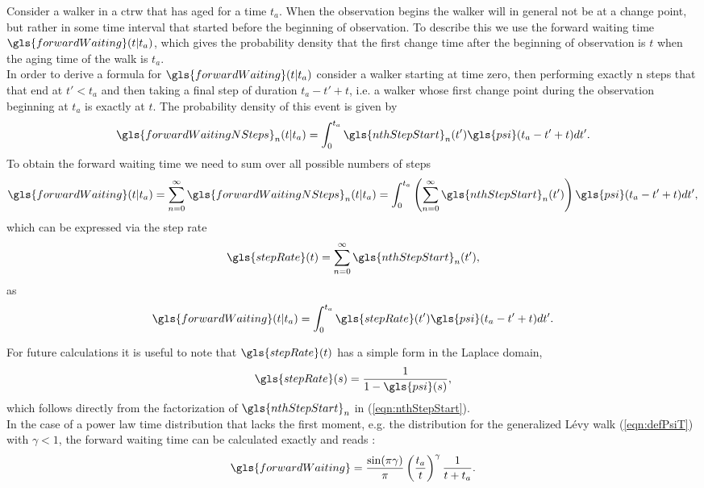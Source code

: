 Consider a walker in a \gls{ctrw} that has aged for a time $t_a$. When the observation begins the walker will in general not be at a change point, but rather in some time interval that started before the beginning of observation. To describe this we use the forward waiting time $\gls{forwardWaiting}(t|t_a)$, which gives the probability density that the first change time after the beginning of observation is $t$ when the aging time of the walk is $t_a$. \\

In order to derive a formula for $\gls{forwardWaiting}(t|t_a)$ consider a walker starting at time zero, then performing exactly n steps that that end at $t' < t_a$ and then taking a final step of duration $t_a-t'+t$, i.e. a walker whose first change point during the observation beginning at $t_a$ is exactly at $t$. The probability density of this event is given by
%
\begin{align}
\gls{forwardWaitingNSteps}_n(t|t_a) = \int^{t_a}_{0} \gls{nthStepStart}_n(t') \gls{psi}(t_a-t'+t) dt'.
\end{align}
%
To obtain the forward waiting time we need to sum over all possible numbers of steps 
%
\begin{align}
\gls{forwardWaiting}(t|t_a) = \sum_{n=0}^{\infty} \gls{forwardWaitingNSteps}_n(t|t_a) 
= \int^{t_a}_{0} \left( \sum_{n=0}^{\infty}  \gls{nthStepStart}_n(t') \right) \gls{psi}(t_a-t'+t) dt',
\end{align}
%
which can be expressed via the step rate
%
\begin{align}
\gls{stepRate}(t) =  \sum_{n=0}^{\infty}  \gls{nthStepStart}_n(t')  \label{eqn:stepRate},
\end{align}
%
as 
%
\begin{align}
\gls{forwardWaiting}(t|t_a) = \int^{t_a}_{0} \gls{stepRate}(t') \gls{psi}(t_a-t'+t) dt'.
\end{align}

For future calculations it is useful to note that $\gls{stepRate}(t)$ has a simple form in the Laplace domain,
%
\begin{align}
\gls{stepRate}(s) = \frac{1}{1-\gls{psi}(s)} ,
\end{align}
%
which follows directly from the factorization of $\gls{nthStepStart}_n$ in (\ref{eqn:nthStepStart}).\\

In the case of a power law time distribution that lacks the first moment, e.g. the distribution for the generalized L\'evy walk (\ref{eqn:defPsiT}) with $\gamma < 1$, the forward waiting time can be calculated exactly and reads \cite{firstSteps}:
%
\begin{align}
\gls{forwardWaiting} = \frac{\sin(\pi \gamma)}{\pi} \left( \frac{t_a}{t} \right)^{\gamma} \frac{1}{t+t_a} \label{eqn:forwardWaiting} .
\end{align}

